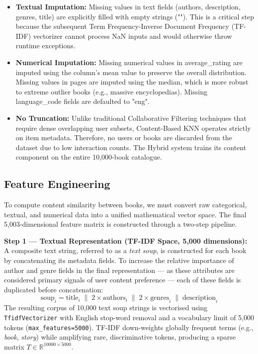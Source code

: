 \documentclass[12pt, a4paper]{article}
\begin{document}
\begin{itemize}[leftmargin=2cm]
  \item \textbf{Textual Imputation:} Missing values in text fields (authors, description, genres, title)
        are explicitly filled with empty strings (""). This is a critical step because the subsequent Term Frequency-Inverse Document Frequency (TF-IDF) vectorizer cannot process NaN inputs and would otherwise throw runtime exceptions.
  \item \textbf{Numerical Imputation:} Missing numerical values in average\_rating are imputed using the column's mean value to preserve the overall distribution. Missing values in pages are imputed using the median, which is more robust to extreme outlier books (e.g., massive encyclopedias). Missing language\_code fields are defaulted to "eng".
  \item \textbf{No Truncation:} Unlike traditional Collaborative Filtering techniques that require dense overlapping user subsets, Content-Based KNN operates strictly on item metadata. Therefore, no users or books are discarded from the dataset due to low interaction counts. The Hybrid system trains its content component on the entire 10,000-book catalogue.
\end{itemize}

\subsection{Feature Engineering}
\label{sec:features}

To compute content similarity between books, we must convert raw categorical, textual, and numerical data into a unified mathematical vector space. The final 5,003-dimensional feature matrix is constructed through a two-step pipeline.

\textbf{Step 1 --- Textual Representation (TF-IDF Space, 5,000 dimensions):}
A composite text string, referred to as a \textit{text soup}, is constructed for each
book by concatenating its metadata fields.
To increase the relative importance of author and genre fields in the final
representation --- as these attributes are considered primary signals of user content
preference --- each of these fields is duplicated before concatenation:
\[
  \text{soup}_i = \text{title}_i \;\|\;
                  2\times\text{authors}_i \;\|\;
                  2\times\text{genres}_i \;\|\;
                  \text{description}_i
\]
The resulting corpus of 10,000 text soup strings is vectorised using
\texttt{TfidfVectorizer} with English stop-word removal and a
vocabulary limit of 5,000 tokens (\texttt{max\_features=5000}).
TF-IDF down-weights globally frequent terms (e.g., \textit{book}, \textit{story})
while amplifying rare, discriminative tokens, producing a sparse matrix
$T \in \mathbb{R}^{10000 \times 5000}$.
\end{document}
